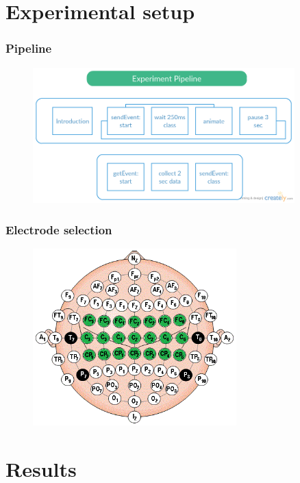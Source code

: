 \documentclass{beamer}
\begin{document}
\section{Experimental setup}

\begin{frame}
  \frametitle{Pipeline}

  \begin{figure}
    \centering
    \includegraphics[width=0.9\textwidth]{brain_racer_pipeline.png}
  \end{figure}
\end{frame}


\begin{frame}
  \frametitle{Electrode selection}

 \begin{figure}
  \centering
     \includegraphics[width=0.7\textwidth]{cap.png}
 \end{figure}

\end{frame}



\section{Results}
\end{document}
